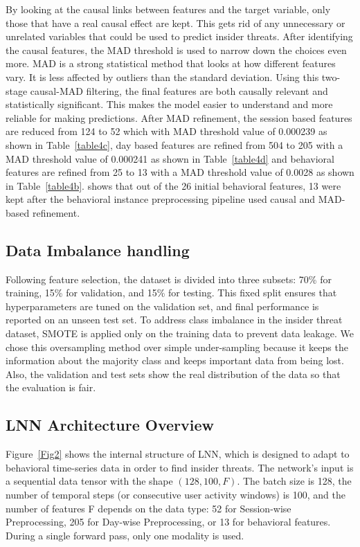 By looking at the causal links between features and the target variable, only those that have a real causal effect are kept. This gets rid of any unnecessary or unrelated variables that could be used to predict insider threats.  After identifying the causal features, the MAD threshold is used to narrow down the choices even more.  MAD is a strong statistical method that looks at how different features vary. It is less affected by outliers than the standard deviation.  Using this two-stage causal-MAD filtering, the final features are both causally relevant and statistically significant. This makes the model easier to understand and more reliable for making predictions. After MAD refinement, the session based features are reduced from 124 to 52 which with MAD threshold value of 0.000239 as shown in Table~\ref{table4c}, day based features are refined from 504 to 205 with a MAD threshold value of 0.000241 as shown in Table~\ref{table4d} and behavioral features are refined from 25 to 13 with a MAD threshold value of 0.0028 as shown in Table~\ref{table4b}. shows that out of the 26 initial behavioral features, 13 were kept after the behavioral instance preprocessing pipeline used causal and MAD-based refinement.

\subsection{Data Imbalance handling}

Following feature selection, the dataset is divided into three subsets: 70\% for training, 15\% for validation, and 15\% for testing. This fixed split ensures that hyperparameters are tuned on the validation set, and final performance is reported on an unseen test set. To address class imbalance in the insider threat dataset, SMOTE is applied only on the training data to prevent data leakage. We chose this oversampling method over simple under-sampling because it keeps the information about the majority class and keeps important data from being lost. Also, the validation and test sets show the real distribution of the data so that the evaluation is fair.

\subsection{LNN Architecture Overview}
Figure~\ref{Fig2} shows the internal structure of LNN, which is designed to adapt to behavioral time-series data in order to find insider threats.  The network's input is a sequential data tensor with the shape \((128, 100, F)\). The batch size is 128, the number of temporal steps (or consecutive user activity windows) is 100, and the number of features F depends on the data type: 52 for Session-wise Preprocessing, 205 for Day-wise Preprocessing, or 13 for behavioral features.  During a single forward pass, only one modality is used.


